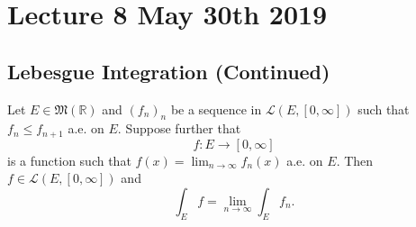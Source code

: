 \documentclass[notoc,notitlepage]{tufte-book}
\begin{document}


\chapter{Lecture 8 May 30th 2019}%
\label{chp:lecture_8_may_30th_2019}

\section{Lebesgue Integration (Continued)}%
\label{sec:lebesgue_integration_continued}

\begin{thm}\label{thm:the_monotone_convergence_theorem}
  Let $E \in \mathfrak{M}(\mathbb{R})$ and $(f_n)_n$ be a sequence in
  $\mathcal{L}(E, [0, \infty])$ such that $f_n \leq f_{n+1}$ a.e. on $E$.
  Suppose further that
  \begin{equation*}
    f : E \to [0, \infty]
  \end{equation*}
  is a function such that $f(x) = \lim_{n \to \infty} f_n(x)$ a.e. on $E$. Then
  $f \in \mathcal{L}(E, [0, \infty])$ and
  \begin{equation*}
    \int_{E} f = \lim_{n \to \infty} \int_{E} f_n.
  \end{equation*}
\end{thm}
\end{document}
